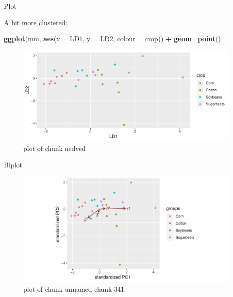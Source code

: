 \documentclass[ignorenonframetext,]{beamer}
\newenvironment{Shaded}{\begin{snugshade}}{\end{snugshade}}
\newcommand{\DataTypeTok}[1]{\textcolor[rgb]{0.13,0.29,0.53}{#1}}
\newcommand{\KeywordTok}[1]{\textcolor[rgb]{0.13,0.29,0.53}{\textbf{#1}}}
\newcommand{\NormalTok}[1]{#1}
\newcommand{\OperatorTok}[1]{\textcolor[rgb]{0.81,0.36,0.00}{\textbf{#1}}}
\newcommand{\StringTok}[1]{\textcolor[rgb]{0.31,0.60,0.02}{#1}}
\begin{document}
\begin{frame}[fragile]{Plot}
\protect\hypertarget{plot}{}

A bit more clustered:

\begin{Shaded}
\begin{Highlighting}[]
\KeywordTok{ggplot}\NormalTok{(mm, }\KeywordTok{aes}\NormalTok{(}\DataTypeTok{x =}\NormalTok{ LD1, }\DataTypeTok{y =}\NormalTok{ LD2, }\DataTypeTok{colour =}\NormalTok{ crop)) }\OperatorTok{+}
\StringTok{  }\KeywordTok{geom_point}\NormalTok{()}
\end{Highlighting}
\end{Shaded}

\begin{figure}
\centering
\includegraphics{figure/nedved-1.pdf}
\caption{plot of chunk nedved}
\end{figure}

\end{frame}

\begin{frame}[fragile]{Biplot}
\protect\hypertarget{biplot-2}{}

\begin{Shaded}
\end{Shaded}

\begin{figure}
\centering
\includegraphics{figure/unnamed-chunk-341-1.pdf}
\caption{plot of chunk unnamed-chunk-341}
\end{figure}

\end{frame}
\end{document}
